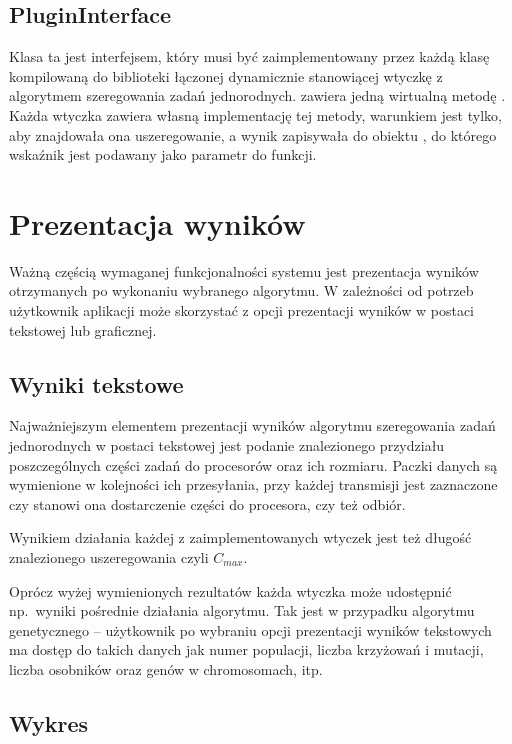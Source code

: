 \subsection{PluginInterface}

Klasa ta jest interfejsem, który musi być zaimplementowany przez każdą klasę kompilowaną do biblioteki łączonej dynamicznie stanowiącej wtyczkę 
z algorytmem szeregowania zadań jednorodnych.  zawiera jedną wirtualną metodę . Każda wtyczka zawiera własną implementację tej metody, warunkiem jest tylko, aby znajdowała ona uszeregowanie, 
a wynik zapisywała do obiektu , do którego wskaźnik jest podawany jako parametr do funkcji.

\section{Prezentacja wyników}

Ważną częścią wymaganej funkcjonalności systemu jest prezentacja wyników otrzymanych po wykonaniu wybranego algorytmu. W zależności od potrzeb 
użytkownik aplikacji może skorzystać z opcji prezentacji wyników w postaci tekstowej lub graficznej.

\subsection{Wyniki tekstowe}

Najważniejszym elementem prezentacji wyników algorytmu szeregowania zadań jednorodnych w postaci tekstowej jest podanie znalezionego przydziału 
poszczególnych części zadań do procesorów oraz ich rozmiaru. Paczki danych są wymienione w kolejności ich przesyłania, przy każdej transmisji 
jest zaznaczone czy stanowi ona dostarczenie części do procesora, czy też odbiór.

Wynikiem działania każdej z zaimplementowanych wtyczek jest też długość znalezionego uszeregowania czyli $C_{max}$.

Oprócz wyżej wymienionych rezultatów każda wtyczka może udostępnić np.~wyniki pośrednie działania algorytmu. Tak jest w przypadku algorytmu 
genetycznego -- użytkownik po wybraniu opcji prezentacji wyników tekstowych ma dostęp do takich danych jak numer populacji, liczba krzyżowań i 
mutacji, liczba osobników oraz genów w chromosomach, itp.

\subsection{Wykres}

